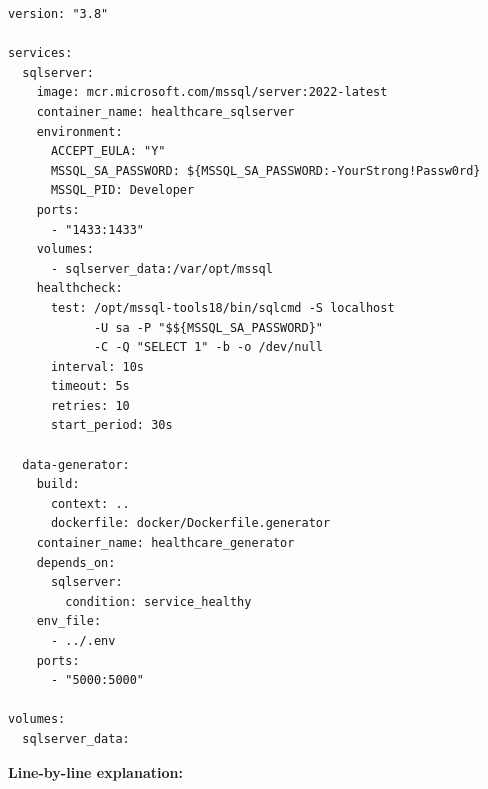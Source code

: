 \documentclass[12pt, a4paper, oneside]{report}
\begin{document}
\begin{lstlisting}[style=yamlstyle, caption={docker/docker-compose.yml}]
version: "3.8"

services:
  sqlserver:
    image: mcr.microsoft.com/mssql/server:2022-latest
    container_name: healthcare_sqlserver
    environment:
      ACCEPT_EULA: "Y"
      MSSQL_SA_PASSWORD: ${MSSQL_SA_PASSWORD:-YourStrong!Passw0rd}
      MSSQL_PID: Developer
    ports:
      - "1433:1433"
    volumes:
      - sqlserver_data:/var/opt/mssql
    healthcheck:
      test: /opt/mssql-tools18/bin/sqlcmd -S localhost
            -U sa -P "$${MSSQL_SA_PASSWORD}"
            -C -Q "SELECT 1" -b -o /dev/null
      interval: 10s
      timeout: 5s
      retries: 10
      start_period: 30s

  data-generator:
    build:
      context: ..
      dockerfile: docker/Dockerfile.generator
    container_name: healthcare_generator
    depends_on:
      sqlserver:
        condition: service_healthy
    env_file:
      - ../.env
    ports:
      - "5000:5000"

volumes:
  sqlserver_data:
\end{lstlisting}

\textbf{Line-by-line explanation:}
\end{document}
